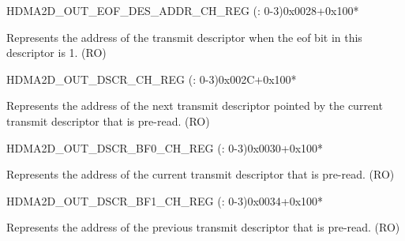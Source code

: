 \begin{register}{H}{DMA2D\_OUT\_EOF\_DES\_ADDR\_CH\_REG (: 0-3)}{0x0028+0x100*}\label{regdesc:DMA2DOUTEOFDESADDRCHNREG}
%
\regnewline%
\begin{regdesc}\begin{reglist}
\label{fielddesc:DMA2DOUTEOFDESADDRCHN}\item [DMA2D\_OUT\_EOF\_DES\_ADDR\_CH\regindex{n}] Represents the address of the transmit descriptor when the eof bit in this descriptor is 1. (RO)
\end{reglist}\end{regdesc}
\end{register}


\begin{register}{H}{DMA2D\_OUT\_DSCR\_CH\_REG (: 0-3)}{0x002C+0x100*}\label{regdesc:DMA2DOUTDSCRCHNREG}
%
\regnewline%
\begin{regdesc}\begin{reglist}
\label{fielddesc:DMA2DOUTLINKDSCRCHN}\item [DMA2D\_OUTLINK\_DSCR\_CH\regindex{n}] Represents the address of the next transmit descriptor pointed by the current transmit descriptor that is pre-read. (RO)
\end{reglist}\end{regdesc}
\end{register}


\begin{register}{H}{DMA2D\_OUT\_DSCR\_BF0\_CH\_REG (: 0-3)}{0x0030+0x100*}\label{regdesc:DMA2DOUTDSCRBF0CHNREG}
%
\regnewline%
\begin{regdesc}\begin{reglist}
\label{fielddesc:DMA2DOUTLINKDSCRBF0CHN}\item [DMA2D\_OUTLINK\_DSCR\_BF0\_CH\regindex{n}] Represents the address of the current transmit descriptor that is pre-read. (RO)
\end{reglist}\end{regdesc}
\end{register}


\begin{register}{H}{DMA2D\_OUT\_DSCR\_BF1\_CH\_REG (: 0-3)}{0x0034+0x100*}\label{regdesc:DMA2DOUTDSCRBF1CHNREG}
%
\regnewline%
\begin{regdesc}\begin{reglist}
\label{fielddesc:DMA2DOUTLINKDSCRBF1CHN}\item [DMA2D\_OUTLINK\_DSCR\_BF1\_CH\regindex{n}] Represents the address of the previous transmit descriptor that is pre-read. (RO)
\end{reglist}\end{regdesc}
\end{register}


